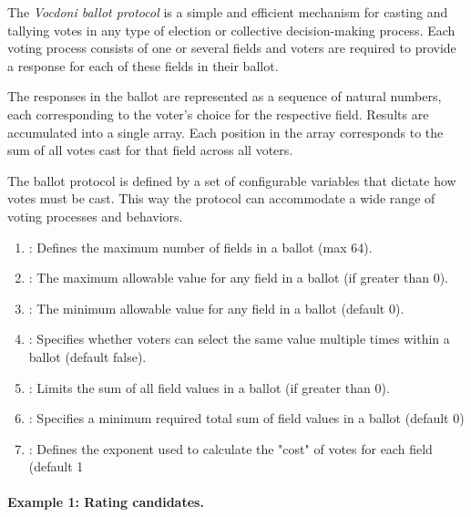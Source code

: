 

The \textit{Vocdoni ballot protocol} is a simple and efficient mechanism for casting and tallying votes in any type of election or collective decision-making process. Each voting process consists of one or several fields and voters are required to provide a response for each of these fields in their ballot.

The responses in the ballot are represented as a sequence of natural numbers, each corresponding to the voter’s choice for the respective field. Results are accumulated into a single array. Each position in the array corresponds to the sum of all votes cast for that field across all voters.

The ballot protocol is defined by a set of configurable variables that dictate how votes must be cast. This way the protocol can accommodate a wide range of voting processes and behaviors.

\begin{enumerate}
	\item \maxcount: Defines the maximum number of fields in a ballot (max 64).
	\item \maxvalue: The maximum allowable value for any field in a ballot (if greater than 0).
	\item \minvalue: The minimum allowable value for any field in a ballot (default 0).
	\item \uniquevalues: Specifies whether voters can select the same value multiple times within a ballot (default false).
	\item \maxtotalcost: Limits the sum of all field values in a ballot (if greater than 0).
	\item \mintotalcost: Specifies a minimum required total sum of field values in a ballot (default 0)
	\item \costexponent: Defines the exponent used to calculate the "cost" of votes for each field (default 1
\end{enumerate}

\begin{figure}[H]
	\centering
\end{figure}

\paragraph{Example 1: Rating candidates.}

